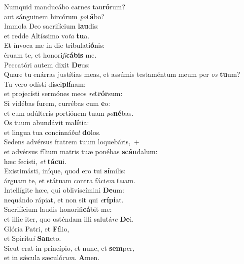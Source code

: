 \evenverse Numquid manducábo carnes tau\textbf{ró}rum?~\*\\
\evenverse aut sánguinem hircórum \textit{po}\textbf{tá}bo?\\
\oddverse Immola Deo sacrifícium \textbf{lau}dis:~\*\\
\oddverse et redde Altíssimo vo\textit{ta} \textbf{tu}a.\\
\evenverse Et ínvoca me in die tribulati\textbf{ó}nis:~\*\\
\evenverse éruam te, et honori\textit{fi}\textbf{cá}\textbf{bis} me.\\
\oddverse Peccatóri autem dixit \textbf{De}us:~\*\\
\oddverse Quare tu enárras justítias meas, et assúmis testaméntum meum per \textit{os} \textbf{tu}um?\\
\evenverse Tu vero odísti disci\textbf{plí}nam:~\*\\
\evenverse et projecísti sermónes meos \textit{re}\textbf{trór}sum:\\
\oddverse Si vidébas furem, currébas cum \textbf{e}o:~\*\\
\oddverse et cum adúlteris portiónem tuam \textit{po}\textbf{né}bas.\\
\evenverse Os tuum abundávit ma\textbf{lí}tia:~\*\\
\evenverse et lingua tua concinná\textit{bat} \textbf{do}los.\\
\oddverse Sedens advérsus fratrem tuum loquebáris,~+\\
\oddverse  et advérsus fílium matris tuæ ponébas \textbf{scán}dalum:~\*\\
\oddverse hæc fecísti, \textit{et} \textbf{tá}\textbf{cu}i.\\
\evenverse Existimásti, iníque, quod ero tui \textbf{sí}milis:~\*\\
\evenverse árguam te, et státuam contra fáci\textit{em} \textbf{tu}am.\\
\oddverse Intellígite hæc, qui obliviscímini \textbf{De}um:~\*\\
\oddverse nequándo rápiat, et non sit qui \textit{e}\textbf{rí}\textbf{pi}at.\\
\evenverse Sacrifícium laudis honorifi\textbf{cá}bit me:~\*\\
\evenverse et illic iter, quo osténdam illi salutá\textit{re} \textbf{De}i.\\
\oddverse Glória Patri, et \textbf{Fí}lio,~\*\\
\oddverse et Spirítu\textit{i} \textbf{San}cto.\\
\evenverse Sicut erat in princípio, et nunc, et \textbf{sem}per,~\*\\
\evenverse et in sǽcula sæculó\textit{rum}. \textbf{A}men.\\
